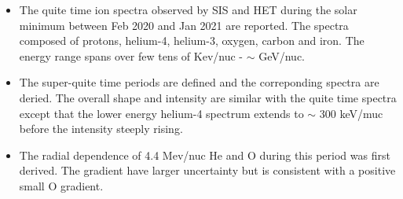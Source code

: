 \begin{itemize}
    \item The quite time ion spectra observed by SIS and HET during the solar minimum between Feb 2020 and Jan 2021 are reported. The spectra composed of protons, helium-4, helium-3, oxygen, carbon and iron. The energy range spans over few tens of Kev/nuc - $\sim$ GeV/nuc.
    \item The super-quite time periods are defined and the correponding spectra are deried. The overall shape and intensity are similar with the quite time spectra except that the lower energy helium-4 spectrum extends to $\sim$ 300 keV/muc before the intensity steeply rising.
    \item The radial dependence of 4.4 Mev/nuc He and O during this period was first derived. The gradient have larger uncertainty but is consistent with a positive small O gradient.
\end{itemize}
